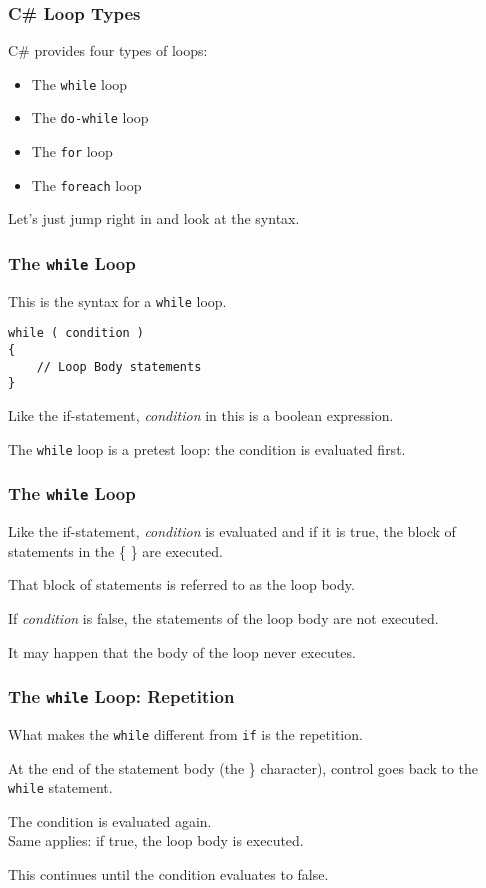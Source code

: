 \begin{frame}
\frametitle{C\# Loop Types}
C\# provides four types of loops:

\begin{itemize}
\item The \texttt{while} loop
\item The \texttt{do-while} loop
\item The \texttt{for} loop
\item The \texttt{foreach} loop
\end{itemize}

Let's just jump right in and look at the syntax.

\end{frame}

\begin{frame}[fragile]
\frametitle{The \texttt{while} Loop}

This is the syntax for a \texttt{while} loop.

\begin{verbatim}
while ( condition ) 
{
    // Loop Body statements
}
\end{verbatim}

Like the if-statement, \textit{condition} in this is a boolean expression.

The \texttt{while} loop is a pretest loop: the condition is evaluated first.

\end{frame}

\begin{frame}
\frametitle{The \texttt{while} Loop}

Like the if-statement, \textit{condition} is evaluated and if it is true, the block of statements in the \{ \} are executed.

That block of statements is referred to as the \alert{loop body}.

If \textit{condition} is false, the statements of the loop body are not executed.

It may happen that the body of the loop never executes.



\end{frame}

\begin{frame}
\frametitle{The \texttt{while} Loop: Repetition}

What makes the \texttt{while} different from \texttt{if} is the \alert{repetition}.

At the end of the statement body (the \} character), control goes back to the \texttt{while} statement.

The condition is evaluated again.\\
	\quad Same applies: if true, the loop body is executed.
	
This continues until the condition evaluates to false.


\end{frame}


